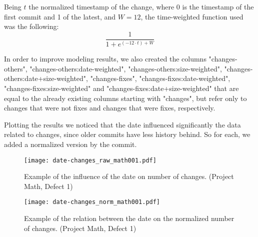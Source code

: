 Being $t$ the normalized timestamp of the change, where 0 is the timestamp of the first commit and 1 of the latest, and $W = 12$, the time-weighted function used was the following:
%
\begin{equation}
  \frac {1} {1 + e^{(-12 \cdot t) + W}}
\end{equation}

In order to improve modeling results, we also created the columns "changes-others", "changes-others:date-weighted", "changes-others:size-weighted", "changes-others:date+size-weighted",
"changes-fixes", "changes-fixes:date-weighted", "changes-fixes:size-weighted" and "changes-fixes:date+size-weighted" that are equal to the already existing columns starting with
"changes", but refer only to changes that were not fixes and changes that were fixes, respectively.

Plotting the results we noticed that the date influenced significantly the data related to changes, since older commits have less history behind.
So for each, we added a normalized version by the commit.

\begin{figure}[ht]
  \begin{center}
    \leavevmode
    \texttt{[image: date-changes\_raw\_math001.pdf]}
    \caption{Example of the influence of the date on number of changes. (Project Math, Defect 1)}
    \label{fig:date-changes.raw}
  \end{center}
\end{figure}

\begin{figure}[ht]
  \begin{center}
    \leavevmode
    \texttt{[image: date-changes\_norm\_math001.pdf]}
    \caption{Example of the relation between the date on the normalized number of changes. (Project Math, Defect 1)}
    \label{fig:date-changes.norm}
  \end{center}
\end{figure}

